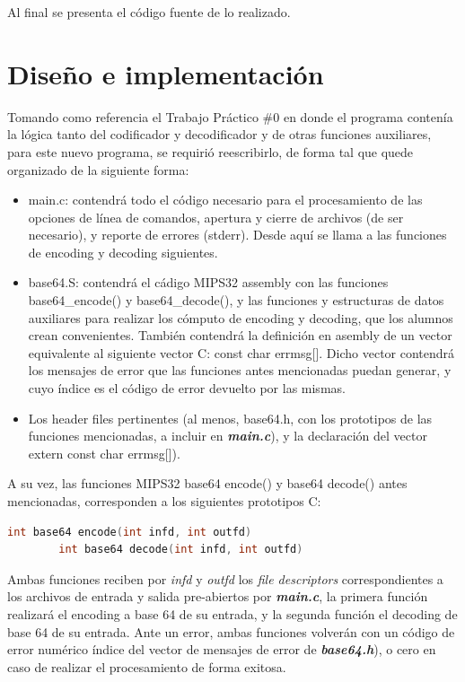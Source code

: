 \documentclass[11pt,a4paper]{article}
\begin{document}
Al final se presenta el código fuente de lo realizado.

\section{Diseño e implementación}

Tomando como referencia el Trabajo Práctico \#0 en donde el programa contenía la lógica tanto del codificador y decodificador y de otras funciones auxiliares, para este nuevo programa, se requirió reescribirlo, de forma tal que quede organizado de la siguiente forma:

\begin{itemize}
	\item{main.c:} contendrá todo el código necesario para el procesamiento de las opciones de línea de comandos, apertura y cierre de archivos (de ser necesario), y reporte de errores (stderr). Desde aquí se llama a las funciones de encoding y decoding siguientes.
	\item {base64.S:} contendrá el cádigo MIPS32 assembly con las funciones base64\_encode() y base64\_decode(), y las funciones y estructuras de datos auxiliares para realizar los cómputo de encoding y decoding, que
los alumnos crean convenientes. También contendrá la definición en asembly de un vector equivalente al siguiente vector C: const char\* errmsg[]. Dicho vector contendrá los mensajes de error que las funciones antes mencionadas puedan generar, y cuyo índice es el código de error devuelto por las mismas.
	\item{Los header files pertinentes} (al menos, base64.h, con los prototipos de las funciones mencionadas, a incluir en \textit{\textbf{main.c}}), y la declaración del vector extern const char\* errmsg[]).

\end{itemize}

A su vez, las funciones MIPS32 base64 encode() y base64 decode() antes mencionadas, corresponden a los siguientes prototipos C:

	\begin{lstlisting}[language=C]
		int base64 encode(int infd, int outfd)
		int base64 decode(int infd, int outfd)
	\end{lstlisting}

Ambas funciones reciben por \textit{infd} y \textit{outfd} los \textit{file descriptors} correspondientes a los archivos de entrada y salida pre-abiertos por \textit{\textbf{main.c}}, la primera función realizará el encoding a base 64 de su entrada, y la segunda función el decoding de base 64 de su entrada.
Ante un error, ambas funciones volverán con un código de error numérico índice del vector de mensajes de error de \textit{\textbf{base64.h}}), o cero en caso de realizar el procesamiento de forma exitosa.
\end{document}

